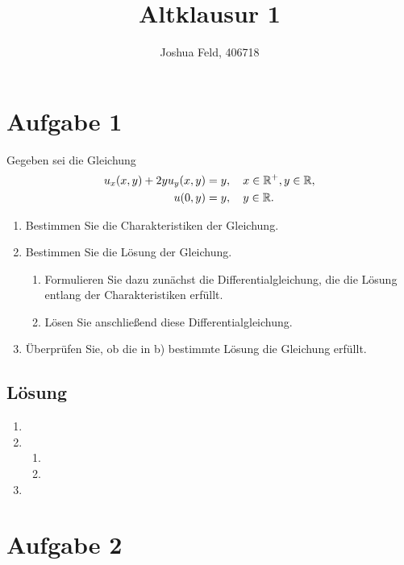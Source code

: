 \documentclass{exercise}
\institute{Applied and Computational Mathematics}
\title{Altklausur 1}
\author{Joshua Feld, 406718}
\begin{document}
    \maketitle


    \section*{Aufgabe 1}

    \begin{problem}
        Gegeben sei die Gleichung
        \begin{align*}
            u_x\parentheses*{x, y} + 2yu_y\parentheses*{x, y} &= y, \quad x \in \R^+, y \in \R,\\
            u\parentheses*{0, y} &= y, \quad y \in \R.
        \end{align*}
        \begin{enumerate}
            \item Bestimmen Sie die Charakteristiken der Gleichung.
            \item Bestimmen Sie die Lösung der Gleichung.
            \begin{enumerate}
                \item Formulieren Sie dazu zunächst die Differentialgleichung, die die Lösung entlang der Charakteristiken erfüllt.
                \item Lösen Sie anschließend diese Differentialgleichung.
            \end{enumerate}
            \item Überprüfen Sie, ob die in b) bestimmte Lösung die Gleichung erfüllt.
        \end{enumerate}
    \end{problem}

    \subsection*{Lösung}
    \begin{enumerate}
        \item
        \item
        \begin{enumerate}
            \item
            \item
        \end{enumerate}
        \item
    \end{enumerate}


    \section*{Aufgabe 2}
\end{document}
